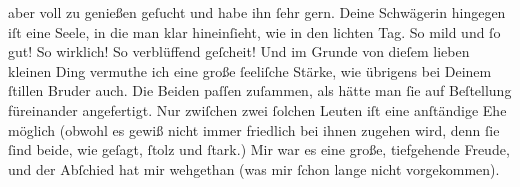                aber voll zu genießen geſucht und habe ihn ſehr gern. Deine Schwägerin hingegen iſt eine Seele, in die
               man klar hineinſieht, wie in den lichten Tag. So mild {\pb}und ſo gut! So wirklich! So verblüffend geſcheit!
               Und im Grunde von dieſem lieben kleinen Ding vermuthe ich eine große ſeeliſche Stärke, wie übrigens
               bei Deinem ſtillen Bruder
               auch. Die Beiden
               paſſen zuſammen, als hätte man ſie auf Beſtellung füreinander angefertigt. Nur
               zwiſchen zwei ſolchen Leuten iſt eine anſtändige Ehe möglich (obwohl es gewiß nicht
               immer friedlich bei ihnen zugehen wird, denn ſie ſind beide, wie geſagt, ſtolz und
               ſtark.) {\pb}Mir war es eine große, tiefgehende Freude,
               und der Abſchied hat mir wehgethan (was mir ſchon lange nicht vorgekommen).\pend
           

